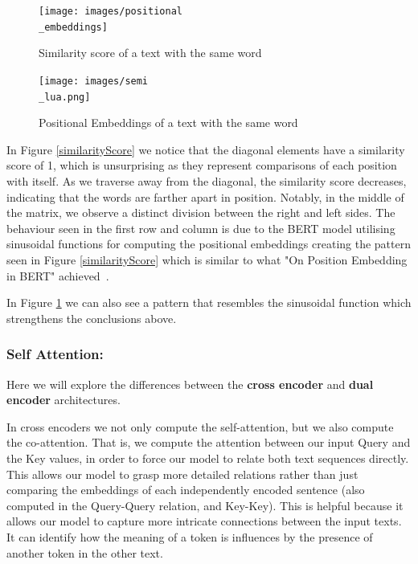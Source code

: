 \documentclass[runningheads]{llncs}
\begin{document}
\begin{figure}[htbp]
    \centering
    \begin{minipage}{0.5\textwidth}
        \centering
        \texttt{[image: images/positional\\\_embeddings]}
        \caption{Similarity score of a text with the same word}
        \label{similarityScore}
    \end{minipage}\hfill
    \begin{minipage}{0.45\textwidth}
        \centering
        \texttt{[image: images/semi\\\_lua.png]}
        \caption{Positional Embeddings of a text with the same word}
         \label{posEmb}
    \end{minipage}
\end{figure}

In Figure \ref{similarityScore} we notice that the diagonal elements have a similarity score of 1, which is unsurprising as they represent comparisons of each position with itself. As we traverse away from the diagonal, the similarity score decreases, indicating that the words are farther apart in position. Notably, in the middle of the matrix, we observe a distinct division between the right and left sides. The behaviour seen in the first row and column is due to the BERT model utilising sinusoidal functions for computing the positional embeddings creating the pattern seen in Figure \ref{similarityScore} which is similar to what "On Position Embedding in BERT" achieved~\cite{wang2021on}.

In Figure \ref{posEmb} we can also see a pattern that resembles the sinusoidal function which strengthens the conclusions above.
\subsubsection{Self Attention:} 
Here we will explore the differences between the \textbf{cross encoder} and \textbf{dual encoder} architectures.

In cross encoders we not only compute the self-attention, but we also compute the co-attention.
That is, we compute the attention between our input Query and the Key values, in order to force our model to relate both text sequences directly. This allows our model to grasp more detailed relations rather than just comparing the embeddings of each independently encoded sentence (also computed in the Query-Query relation, and Key-Key).
This is helpful because it allows our model to capture more intricate connections between the input texts. It can identify how the meaning of a token is influences by the presence of another token in the other text.
\end{document}
